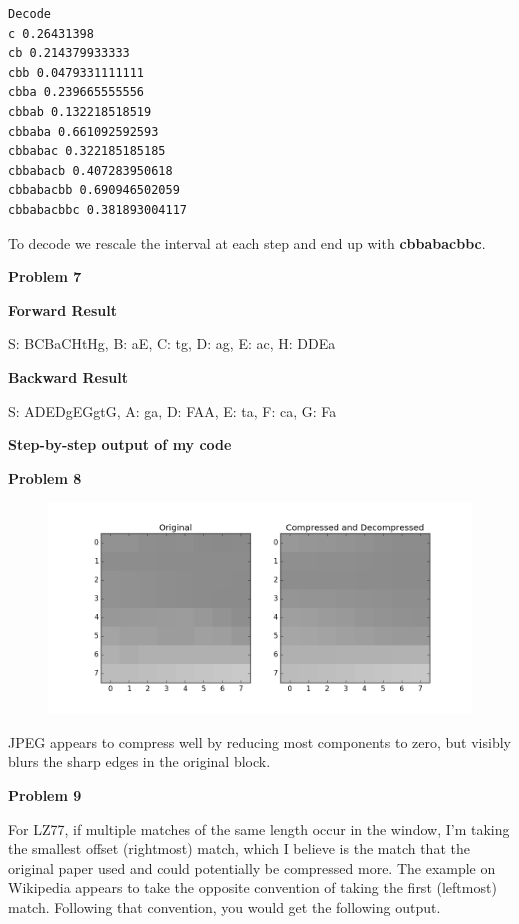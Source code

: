 \documentclass[11pt]{article}
\begin{document}
\begin{verbatim}
Decode
c 0.26431398
cb 0.214379933333
cbb 0.0479331111111
cbba 0.239665555556
cbbab 0.132218518519
cbbaba 0.661092592593
cbbabac 0.322185185185
cbbabacb 0.407283950618
cbbabacbb 0.690946502059
cbbabacbbc 0.381893004117
\end{verbatim}

To decode we rescale the interval at each step and end up with \textbf{cbbabacbbc}.

\medskip

\noindent \textbf{Problem 7}

\noindent \textbf{Forward Result}

S: BCBaCHtHg, B: aE, C: tg, D: ag, E: ac, H: DDEa

\noindent \textbf{Backward Result}

S: ADEDgEGgtG, A: ga, D: FAA, E: ta, F: ca, G: Fa

\noindent \textbf{Step-by-step output of my code}


\medskip

\noindent \textbf{Problem 8}


\begin{figure}[h!]
  \includegraphics[width=7in]{jpegtest.png}
\end{figure}

JPEG appears to compress well by reducing most components to zero, but visibly blurs the sharp edges in the original block.

\pagebreak

\noindent \textbf{Problem 9}



For LZ77, if multiple matches of the same length occur in the window, I'm taking the smallest offset (rightmost) match, which I believe is the match that the original paper used and could potentially be compressed more.  The example on Wikipedia appears to take the opposite convention of taking the first (leftmost) match.  Following that convention, you would get the following output.
\end{document}
